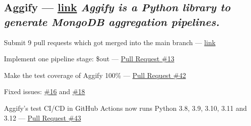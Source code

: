 \subsection{{Aggify --- \href{https://github.com/Aggify/aggify}{link} \hfill \textit{Aggify is a Python library to generate MongoDB aggregation pipelines.}}}
\begin{zitemize}
\item Submit 9 pull requests which got merged into the main branch --- \href{https://github.com/Aggify/aggify/pulls?q=is\%3Apr+is\%3Aclosed+author\%3Amahdihaghverdi}{link}
\item Implement one pipeline stage: {\ttfamily \$out} --- \href{https://github.com/Aggify/aggify/pull/13}{Pull Request \#13}
\item Make the test coverage of Aggify 100\% --- \href{https://github.com/Aggify/aggify/pull/42}{Pull Request \#42}
\item Fixed issues: \href{https://github.com/Aggify/aggify/pull/22}{\#16} and \href{https://github.com/Aggify/aggify/pull/21}{\#18}
\item Aggify's test CI/CD in GitHub Actions now runs Python 3.8, 3.9, 3.10, 3.11 and 3.12 --- \href{https://github.com/Aggify/aggify/pull/43}{Pull Request \#43}
\end{zitemize}

